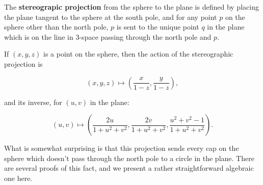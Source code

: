 
\begin{definition}
	The \textbf{stereograpic projection} from the sphere to the plane is defined by placing the plane tangent to the sphere at the south pole, and for any point $p$ on the sphere other than the north pole, $p$ is sent to the unique point $q$ in the plane which is on the line in 3-space passing through the north pole and $p$.
	
	If $(x,y,z)$ is a point on the sphere, then the action of the stereographic projection is
	
	$$(x,y,z)\mapsto \left(\frac{x}{1-z},\frac{y}{1-z}\right),$$
	
	and its inverse, for $(u,v)$ in the plane:
	
	$$(u,v)\mapsto \left( \frac{2u}{1+u^2+v^2},\frac{2v}{1+u^2+v^2}, \frac{u^2+v^2-1}{1+u^2+v^2}   \right).$$
	
	
\end{definition}




What is somewhat surprising is that this projection sends every cap on the sphere which doesn't pass through the north pole to a circle in the plane.  There are several proofs of this fact, and we present a rather straightforward algebraic one here.

